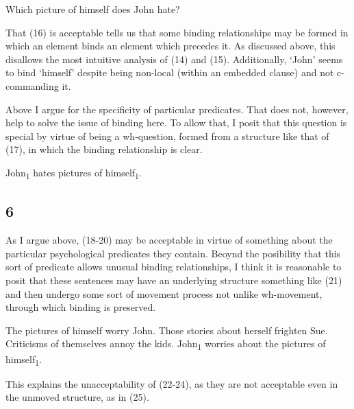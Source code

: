 \documentclass[doc,12pt]{apa6}
\begin{document}
\begin{exe}
	\ex Which picture of himself does John hate?
\end{exe}

That (16) is acceptable tells us that some binding relationships may be formed
in which an element binds an element which precedes it. As discussed above,
this disallows the most intuitive analysis of (14) and (15). Additionally,
`John' seems to bind `himself' despite being non-local (within an embedded
clause) and not c-commanding it.

Above I argue for the specificity of particular predicates. That does not,
however, help to solve the issue of binding here. To allow that, I posit that
this question is special by virtue of being a wh-question, formed from a
structure like that of (17), in which the binding relationship is clear.
\begin{exe}
	\ex John\textsubscript{1} hates pictures of himself\textsubscript{1}.
\end{exe}

\subsection{6}

As I argue above, (18-20) may be acceptable in virtue of something about the
particular psychological predicates they contain. Beoynd the posibility that
this sort of predicate allows unusual binding relationships, I think it is
reasonable to posit that these sentences may have an underlying structure
something like (21) and then undergo some sort of movement process not unlike
wh-movement, through which binding is preserved.
\begin{exe}
	\ex The pictures of himself worry John.
	\ex Those stories about herself frighten Sue.
	\ex Criticisms of themselves annoy the kids.
	\ex John\textsubscript{1} worries about the pictures of himself\textsubscript{1}.
\end{exe}
This explains the unacceptability of (22-24), as they are not acceptable even 
in the unmoved structure, as in (25).
\begin{exe}
\end{exe}
\end{document}
